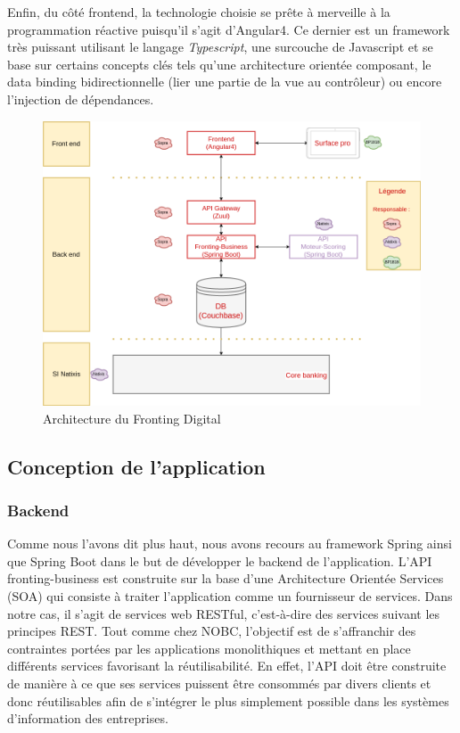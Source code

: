 	Enfin, du côté frontend, la technologie choisie se prête à merveille à la programmation réactive puisqu'il s'agit d'Angular4. Ce dernier est un framework très puissant utilisant le langage \textit{Typescript}, une surcouche de Javascript et se base sur certains concepts clés tels qu'une architecture orientée composant, le data binding bidirectionnelle (lier une partie de la vue au contrôleur) ou encore l'injection de dépendances.

\begin{figure}[h!]
	\includegraphics[scale=0.50]{images/travailBP1818/architecture/archiFonc.png}
	\centering
	\caption{Architecture du Fronting Digital}
	\label{archiFoncBP1818}
\end{figure}

\subsection{Conception de l'application}

\subsubsection{Backend}

	Comme nous l'avons dit plus haut, nous avons recours au framework Spring ainsi que Spring Boot dans le but de développer le backend de l'application. L'API fronting-business est construite sur la base d'une Architecture Orientée Services (SOA) qui consiste à traiter l'application comme un fournisseur de services. Dans notre cas, il s'agit de services web RESTful, c'est-à-dire des services suivant les principes REST. Tout comme chez NOBC, l'objectif est de s'affranchir des contraintes portées par les applications monolithiques et mettant en place différents services favorisant la réutilisabilité. En effet, l'API doit être construite de manière à ce que ses services puissent être consommés par divers clients et donc réutilisables afin de s'intégrer le plus simplement possible dans les systèmes d'information des entreprises. \\
	
